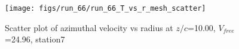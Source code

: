 \begin{figure}[H]
\centering
\texttt{[image: figs/run\_66/run\_66\_T\_vs\_r\_mesh\_scatter]}
\caption{Scatter plot of azimuthal velocity vs radius at $z/c$=10.00, $V_{free}$=24.96, station7}
\label{fig:run_66_T_vs_r_mesh_scatter}
\end{figure}


